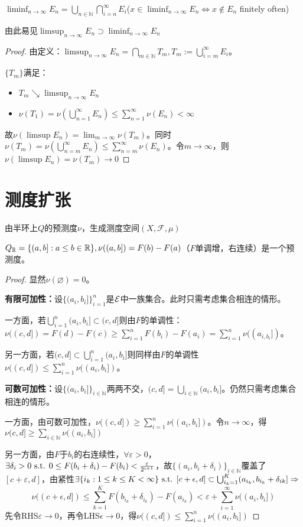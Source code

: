 \documentclass{ctexart}
\begin{document}
$\liminf_{n\to\infty} E_{n}=\bigcup_{n\in\mathbb{N}}\bigcap_{i=n}^{\infty} E_{i}$($x\in\liminf_{n\to\infty}E_{n}\Leftrightarrow x\not\in E_{n}$ finitely often)

由此易见$\limsup_{n\to\infty}E_{n}\supset\liminf_{n\to\infty}E_{n}$

\begin{proof}
  由定义：$\limsup_{n\to\infty} E_{n}=\bigcap_{m\in\mathbb{N}}T_{m},T_{m}:=\bigcup_{i=m}^{\infty}E_{i}$。

  $\{T_{m}\}$满足：
  \begin{itemize}
  \item $T_{m}\searrow \limsup_{n\to\infty} E_{n}$
  \item $\nu(T_{1})=\nu(\bigcup_{n=1}^\infty E_{n})\leq \sum_{n=1}^{\infty}\nu(E_{n})<\infty$
  \end{itemize}
  故$\nu(\limsup E_{n})=\lim_{m\to\infty}\nu(T_{m})$。同时$\nu(T_{m})=\nu(\bigcup_{n=m}^{\infty}E_{n})\leq \sum_{n=m}^{\infty}\nu(E_{n})$。令$m\to\infty$，则$\nu(\limsup E_{n})=\nu(T_{m})\to 0$
\end{proof}

\section{测度扩张}

由半环上$Q$的预测度$\nu$，生成测度空间$(X,\mathscr{F},\mu)$
\begin{Eg}
  $Q_{\mathbb{R}}=\{(a,b]:a\leq b\in\mathbb{R}\},\nu((a,b])=F(b)-F(a)$（$F$单调增，右连续）是一个预测度。
\end{Eg}
\begin{proof}
显然$\nu(\varnothing)=0$。

\textbf{有限可加性：}设$\{(a_{i},b_{i}]\}_{i=1}^{n}$是$\mathcal{E}$中一族集合。此时只需考虑集合相连的情形。

一方面，若$\bigcup_{i=1}^{n}(a_{i},b_{i}]\subset (c,d]$则由$F$的单调性：$\nu((c,d])=F(d)-F(c)\geq\sum_{i=1}^{n}F(b_{i})-F(a_{i})=\sum_{i=1}^{n}\nu((a_{i,b_{i}}])$。

另一方面，若$(c,d]\subset \bigcup_{i=1}^{n}(a_{i},b_{i}]$则同样由$F$的单调性$ \nu((c,d])\leq \sum_{i=1}^{n}\nu((a_{i},b_{i}])$。

\textbf{可数可加性：}设$\{(a_{i},b_{i}]\}_{i\in\mathbb{N}}$两两不交，$(c,d]=\bigcup_{i\in\mathbb{N}}(a_{i},b_{i}]$。仍然只需考虑集合相连的情形。

一方面，由可数可加性，$\nu((c,d])\geq \sum_{i=1}^{n}\nu((a_{i},b_{i}])$。令$n\to\infty$，得$\nu(c,d]\geq\sum_{i\in\mathbb{N}}\nu((a_{i},b_{i}])$

另一方面，由$F$于$b_{i}$的右连续性，$\forall\varepsilon>0$，$\exists \delta_{i}>0\text{ s.t. } 0\leq F(b_{i}+\delta_{i})-F(b_{i})<\frac{\varepsilon}{2^{i+1}}$，故$\{(a_{i},b_{i}+\delta_{i})\}_{i\in\mathbb{N}}$覆盖了$[c+\varepsilon,d]$，由紧性$\exists \{i_{k}:1\leq k\leq K<\infty\}\text{ s.t. } [c+\epsilon,d]\subset \bigcup_{i_{k}=1}^{K}(a_{i_{k}},b_{i_{k}}+\delta_{ik}]\Rightarrow$
\[\nu((c+\epsilon,d])\leq \sum_{k=1}^{K}F(b_{i_{k}}+\delta_{i_{k}})-F(a_{i_{k}})<\varepsilon+\sum_{i=1}^{\infty}\nu((a_{i},b_{i}])\]
先令RHS$\varepsilon\to 0$，再令LHS$\epsilon\to 0$，得$\nu((c,d])\leq \sum_{i=1}^{n}\nu((a_{i},b_{i}])$
\end{proof}
\end{document}
